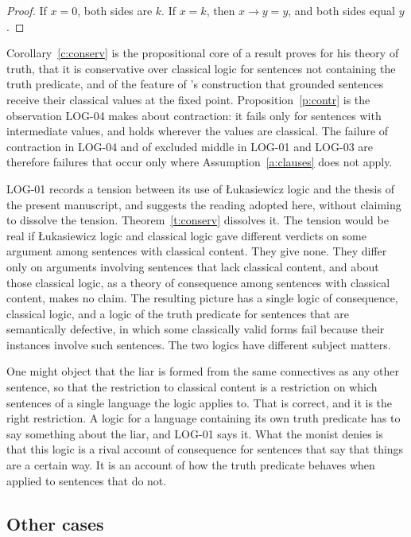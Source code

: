 \documentclass{situationist-preprint}
\begin{document}
\begin{proof}
If $x = 0$, both sides are $k$. If $x = k$, then $x \to y = y$, and both sides equal $y$.
\end{proof}

Corollary~\ref{c:conserv} is the propositional core of a result \citet{Field2008} proves for his theory of truth, that it is conservative over classical logic for sentences not containing the truth predicate, and of the feature of \citet{Kripke1975}'s construction that grounded sentences receive their classical values at the fixed point. Proposition~\ref{p:contr} is the observation LOG-04 makes about contraction: it fails only for sentences with intermediate values, and holds wherever the values are classical. The failure of contraction in LOG-04 and of excluded middle in LOG-01 and LOG-03 are therefore failures that occur only where Assumption~\ref{a:clauses} does not apply.

LOG-01 records a tension between its use of Łukasiewicz logic and the thesis of the present manuscript, and suggests the reading adopted here, without claiming to dissolve the tension. Theorem~\ref{t:conserv} dissolves it. The tension would be real if Łukasiewicz logic and classical logic gave different verdicts on some argument among sentences with classical content. They give none. They differ only on arguments involving sentences that lack classical content, and about those classical logic, as a theory of consequence among sentences with classical content, makes no claim. The resulting picture has a single logic of consequence, classical logic, and a logic of the truth predicate for sentences that are semantically defective, in which some classically valid forms fail because their instances involve such sentences. The two logics have different subject matters.

One might object that the liar is formed from the same connectives as any other sentence, so that the restriction to classical content is a restriction on which sentences of a single language the logic applies to. That is correct, and it is the right restriction. A logic for a language containing its own truth predicate has to say something about the liar, and LOG-01 says it. What the monist denies is that this logic is a rival account of consequence for sentences that say that things are a certain way. It is an account of how the truth predicate behaves when applied to sentences that do not.

\subsection{Other cases}
\end{document}
